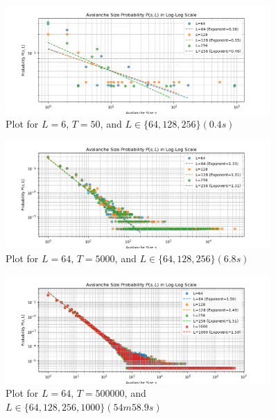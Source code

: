 \documentclass[10pt,letterpaper, onecolumn]{report}
\begin{document}
\begin{flushleft}
\begin{enumerate}
            \begin{figure}[htbp!] %
                \centering
                \includegraphics[width=0.9\textwidth]{../probability_one.png} %
                \caption{Plot for $L = 6$, $T = 50$, and $L \in \{64, 128, 256\}(0.4s)$} %
            \end{figure}
            \begin{figure}[htbp!] %
                \centering
                \includegraphics[width=0.9\textwidth]{../probability_small.png} %
                \caption{Plot for $L = 64$, $T = 5000$, and $L \in \{64, 128, 256\}(6.8s)$ } %
            \end{figure}
            \begin{figure}[htbp!] %
                \centering
                \includegraphics[width=0.9\textwidth]{../probability_big_long.png} %
                \caption{Plot for $L = 64$, $T = 500000$, and $L \in \{64, 128, 256, 1000\}(54m 58.9s)$} %
            \end{figure}


\end{enumerate}
\end{flushleft}
\end{document}
